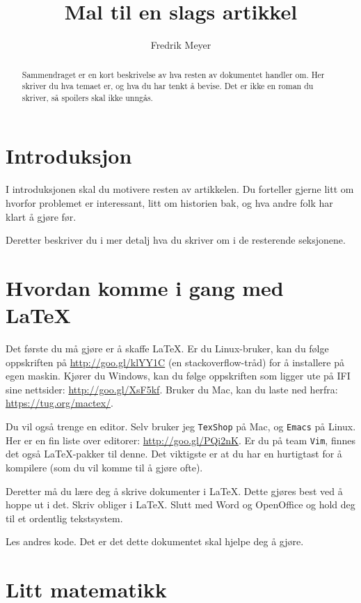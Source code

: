 \documentclass[11pt, a4paper]{article}
\begin{document}
\title{Mal til en slags artikkel}
\author{Fredrik Meyer}
\maketitle 

\begin{abstract}
\noindent
Sammendraget er en kort beskrivelse av hva resten av dokumentet handler om. Her skriver du hva temaet er, og hva du har tenkt å bevise. Det er ikke en roman du skriver, så spoilers skal ikke unngås.
\end{abstract}

\section{Introduksjon}

I introduksjonen skal du motivere resten av artikkelen. Du forteller gjerne litt om hvorfor problemet er interessant, litt om historien bak, og hva andre folk har klart å gjøre før.

Deretter beskriver du i mer detalj hva du skriver om i de resterende seksjonene.  %

\section{Hvordan komme i gang med \LaTeX}

Det første du må gjøre er å skaffe \LaTeX. Er du Linux-bruker, kan du følge oppskriften på \url{http://goo.gl/klYY1C} (en stackoverflow-tråd) for å installere på egen maskin. Kjører du Windows, kan du følge oppskriften som ligger ute på IFI sine nettsider: \url{http://goo.gl/XsF5kf}. Bruker du Mac, kan du laste ned herfra: \url{https://tug.org/mactex/}.

Du vil også trenge en editor. Selv bruker jeg \texttt{TexShop} på Mac, og \texttt{Emacs} på Linux. Her er en fin liste over editorer: \url{http://goo.gl/PQi2nK}. Er du på team \texttt{Vim}, finnes det også \LaTeX-pakker til denne. Det viktigste er at du har en hurtigtast for å kompilere (som du vil komme til å gjøre ofte).

Deretter må du lære deg å skrive dokumenter i \LaTeX. Dette gjøres best ved å hoppe ut i det. Skriv obliger i \LaTeX. Slutt med Word og OpenOffice og hold deg til et ordentlig tekstsystem.

Les andres kode. Det er det dette dokumentet skal hjelpe deg å gjøre.

\section{Litt matematikk}
\end{document}
